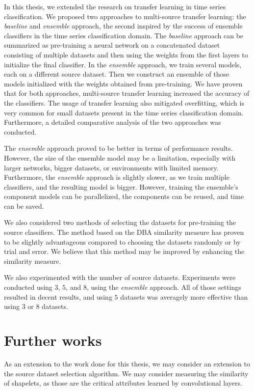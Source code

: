 \documentclass[a4paper,11pt,twoside]{report}
\theoremstyle{definition}
\begin{document}
In this thesis, we extended the research on transfer learning in time series classification. We proposed two approaches to multi-source transfer learning: the \textit{baseline} and \textit{ensemble} approach, the second inspired by the success of ensemble classifiers in the time series classification domain. The \textit{baseline} approach can be summarized as pre-training a neural network on a concatenated dataset consisting of multiple datasets and then using the weights from the first layers to initialize the final classifier. In the \textit{ensemble} approach, we train several models, each on a different source dataset. Then we construct an ensemble of those models initialized with the weights obtained from pre-training. We have proven that for both approaches, multi-source transfer learning increased the accuracy of the classifiers. The usage of transfer learning also mitigated overfitting, which is very common for small datasets present in the time series classification domain. Furthermore, a detailed comparative analysis of the two approaches was conducted.

The \textit{ensemble} approach proved to be better in terms of performance results. However, the size of the ensemble model may be a limitation, especially with larger networks, bigger datasets, or environments with limited memory. Furthermore, the \textit{ensemble} approach is slightly slower, as we train multiple classifiers, and the resulting model is bigger. However, training the ensemble's component models can be parallelized, the components can be reused, and time can be saved.


We also considered two methods of selecting the datasets for pre-training the source classifiers. The method based on the DBA similarity measure has proven to be slightly advantageous compared to choosing the datasets randomly or by trial and error. We believe that this method may be improved by enhancing the similarity measure.

We also experimented with the number of source datasets. Experiments were conducted using $3$, $5$, and $8$, using the \textit{ensemble} approach. All of those settings resulted in decent results, and using $5$ datasets was averagely more effective than using $3$ or $8$ datasets.

\section{Further works}
As an extension to the work done for this thesis, we may consider an extension to the source dataset selection algorithm. We may consider measuring the similarity of shapelets, as those are the critical attributes learned by convolutional layers.
\end{document}
